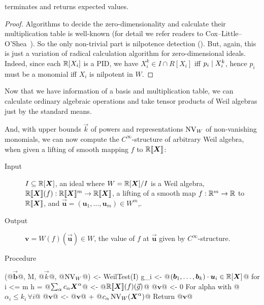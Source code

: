 \documentclass[%
  sigconf,authorversion,screen]{acmart}
\begin{document}
\begin{theorem}
   terminates and returns expected values.
\end{theorem}
\begin{proof}
  Algorithms to decide the zero-dimensionality and calculate their multiplication table is well-known (for detail we refer readers to Cox--Little--O'Shea~\cite[Chapter 2]{CLO:2005}).
  So the only non-trivial part is nilpotence detection ().
  But, again, this is just a variation of radical calculation algorithm for zero-dimensional ideals.
  Indeed, since each $\mathbb{R}[X_i]$ is a PID, we have $X_i^k \in I \cap R[X_i]$ iff $p_i \mathrel{\mid} X_i^k$, hence $p_i$ must be a monomial iff $X_i$ is nilpotent in $W$.
\end{proof}
Now that we have information of a basis and multiplication table, we can calculate ordinary algebraic operations and take tensor products of Weil algebras just by the standard means.

And, with upper bounds $\vec k$ of powers and representations $\operatorname{NV}_W$ of non-vanishing monomials, we can now compute the $C^\infty$-structure of arbitrary Weil algebra, when given a lifting of smooth mapping $f$ to $\mathbb{R}\llbracket\boldsymbol{X}\rrbracket$:

\begin{algorithm}
  \hfill\vspace{-.25em}
  \begin{description}
    \item[Input]
      $I \subseteq \mathbb{R}[\boldsymbol{X}]$, an ideal where $W = \mathbb{R}[\boldsymbol{X}]/I$ is a Weil algebra,
      $\mathbb{R} \llbracket\boldsymbol{X}\rrbracket(f): \mathbb{R}\llbracket\boldsymbol{X}\rrbracket^m \to \mathbb{R}\llbracket\boldsymbol{X}\rrbracket$, a lifting of a smooth map $f: \mathbb{R}^m \to \mathbb{R}$ to $\mathbb{R}\llbracket\boldsymbol{X}\rrbracket$, and $\vec{\boldsymbol{u}} = (\boldsymbol{u}_1, \dots, \boldsymbol{u}_m) \in W^m$,.
    \item[Output] $\boldsymbol{v} = W(f)(\vec{\boldsymbol u}) \in W$, the value of $f$ at $\vec{\boldsymbol{u}}$ given by $C^\infty$-structure.
    \item[Procedure] 
  \end{description}
\begin{alg}
(@$\vec{\boldsymbol{b}}$@, M, @$\vec{k}$@, @$\operatorname{NV}_W$@) <- WeilTest(I)
g_i <- @$(\boldsymbol{b}_1, \dots, \boldsymbol{b}_k) \cdot \boldsymbol{u}_i \in \mathbb{R}[\boldsymbol{X}]$@ for i <= m
h = @$\sum_\alpha c_\alpha \boldsymbol{X}^\alpha$@ <- @$\mathbb{R}\llbracket\boldsymbol{X}\rrbracket(f)(\vec{g})$@
@$\boldsymbol v$@ <- 0
For alpha with @$\alpha_i \leq k_i\, \forall i$@
  @$\boldsymbol{v}$@ <- @$\boldsymbol v$@ + @$c_\alpha \operatorname{NV}_W(\boldsymbol{X}^\alpha)$@
Return @$\boldsymbol{v}$@
\end{alg}
\end{algorithm}
\end{document}
